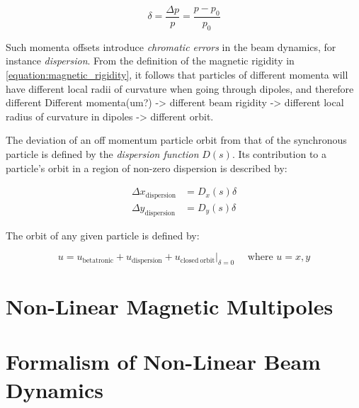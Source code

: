 \begin{equation}
    \delta = \frac{\Delta p}{p} = \frac{p - p_{0}}{p_{0}}
    \label{equation:momentum_deviation}
\end{equation}

Such momenta offsets introduce \emph{chromatic errors} in the beam dynamics, for instance \emph{dispersion}.
From the definition of the magnetic rigidity in \cref{equation:magnetic_rigidity}, it follows that particles of different momenta will have different local radii of curvature when going through dipoles, and therefore different 
Different momenta(um?) -> different beam rigidity -> different local radius of curvature in dipoles -> different orbit.

The deviation of an off momentum particle orbit from that of the synchronous particle is defined by the \emph{dispersion function} $D(s)$.
Its contribution to a particle's orbit in a region of non-zero dispersion is described by:

\begin{equation}
    \begin{aligned}
    \Delta x_{\mathrm{dispersion}} &= D_{x}(s) \delta \\
    \Delta y_{\mathrm{dispersion}} &= D_{y}(s) \delta
    \end{aligned}
    \label{equation:dispersion_contribution_to_orbit}
\end{equation}
\bigbreak

The orbit of any given particle is defined by:

\begin{equation}
    u = u_{\mathrm{betatronic}} + u_{\mathrm{dispersion}} + \left.u_{\mathrm{closed \ orbit}} \right\rvert_{\delta = 0} \quad \text{ where } u = x, y
    \label{equation:_particle_orbit}
\end{equation}


\section{Non-Linear Magnetic Multipoles}


\section{Formalism of Non-Linear Beam Dynamics}

